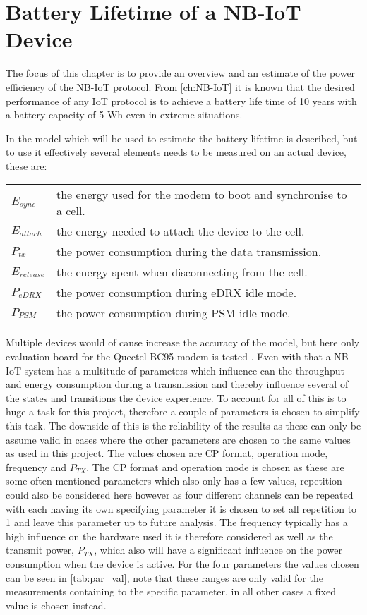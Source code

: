 \chapter{Battery Lifetime of a NB-IoT Device} \label{ch:BatTest}

The focus of this chapter is to provide an overview and an estimate of the power efficiency of the NB-IoT protocol. From \autoref{ch:NB-IoT} it is known that the desired performance of any IoT protocol is to achieve a battery life time of 10 years with a battery capacity of 5 Wh even in extreme situations. 

In  the model which will be used to estimate the battery lifetime is described, but to use it effectively several elements needs to be measured on an actual device, these are:

\begin{tabular}{ll}
$E_{sync}$ & the energy used for the modem to boot and synchronise to a cell. \\
$E_{attach}$ & the energy needed to attach the device to the cell. \\
$P_{tx}$ & the power consumption during the data transmission. \\
$E_{release}$ & the energy spent when disconnecting from the cell. \\
$P_{eDRX}$ & the power consumption during \gls{eDRX} idle mode. \\
$P_{PSM}$ & the power consumption during \gls{PSM} idle mode. \\
\end{tabular}

Multiple devices would of cause increase the accuracy of the model, but here only evaluation board for the Quectel BC95 modem is tested \citep{BC95}. Even with that a \gls{NB-IoT} system has a multitude of parameters which influence can the throughput and energy consumption during a transmission and thereby influence several of the states and transitions the device experience. To account for all of this is to huge a task for this project, therefore a couple of parameters is chosen to simplify this task. The downside of this is the reliability of the results as these can only be assume valid in cases where the other parameters are chosen to the same values as used in this project. The values chosen are CP format, operation mode, frequency and $P_{TX}$. The CP format and operation mode is chosen as these are some often mentioned parameters which also only has a few values, repetition could also be considered here however as four different channels can be repeated with each having its own specifying parameter it is chosen to set all repetition to 1 and leave this parameter up to future analysis. The frequency typically has a high influence on the hardware used it is therefore considered as well as the transmit power, $P_{TX}$, which also will have a significant influence on the power consumption when the device is active. For the four parameters the values chosen can be seen in \autoref{tab:par_val}, note that these ranges are only valid for the measurements containing to the specific parameter, in all other cases a fixed value is chosen instead.

